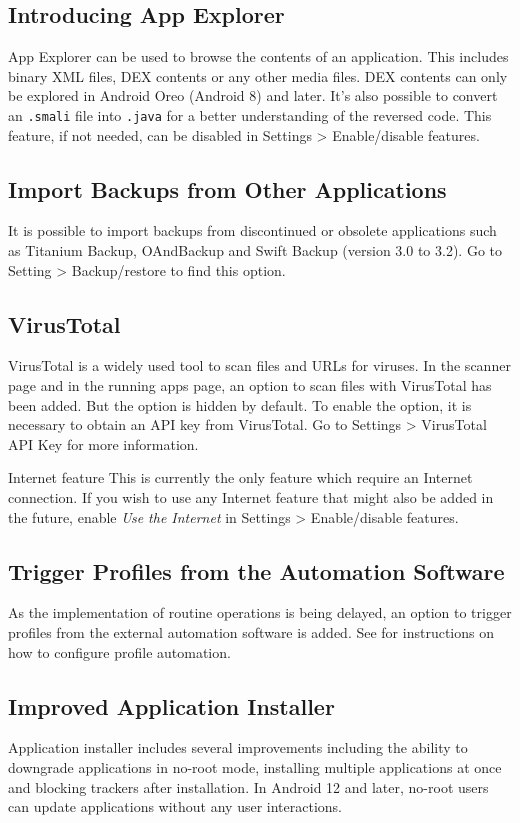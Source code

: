 \subsection{Introducing App Explorer}
App Explorer can be used to browse the contents of an application. This includes binary XML files, DEX contents or any other media files.
DEX contents can only be explored in Android Oreo (Android 8) and later. It's also possible to convert an \texttt{.smali} file into \texttt{.java} for a better understanding of the reversed code.
This feature, if not needed, can be disabled in Settings > Enable/disable features.

\subsection{Import Backups from Other Applications}
It is possible to import backups from discontinued or obsolete applications such as Titanium Backup, OAndBackup and Swift Backup (version 3.0 to 3.2).
Go to Setting > Backup/restore to find this option.

\subsection{VirusTotal}
VirusTotal is a widely used tool to scan files and URLs for viruses. In the scanner page and in the running apps page, an option to scan files with VirusTotal has been added.
But the option is hidden by default. To enable the option, it is necessary to obtain an API key from VirusTotal. Go to Settings > VirusTotal API Key for more information.

\begin{warning}{Internet feature}
    This is currently the only feature which require an Internet connection. If you wish to use any Internet feature that might also be added in the future,
    enable \textit{Use the Internet} in Settings > Enable/disable features.
\end{warning}

\subsection{Trigger Profiles from the Automation Software}
As the implementation of routine operations is being delayed, an option to trigger profiles from the external automation software is added.
See  for instructions on how to configure profile automation.

\subsection{Improved Application Installer}
Application installer includes several improvements including the ability to downgrade applications in no-root mode, installing multiple applications at once and blocking trackers after installation.
In Android 12 and later, no-root users can update applications without any user interactions.

